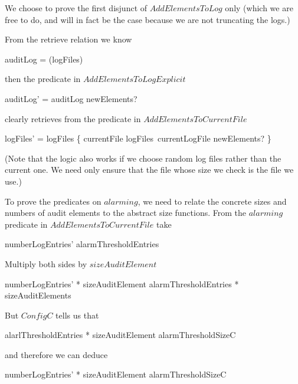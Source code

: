 We choose to prove the first disjunct of $AddElementsToLog$ only
(which we are free to do,
and will in fact be the case because we are not truncating the logs.)

From the retrieve relation we know

\begin{zed}
	auditLog = 
\bigcup (\ran logFiles)
\end{zed}

then the predicate in $AddElementsToLogExplicit$

\begin{argue}
	auditLog' = auditLog \cup newElements?
\end{argue}

clearly retrieves from the predicate in $AddElementsToCurrentFile$

\begin{argue}
	logFiles' = logFiles \oplus
		\{ currentFile \mapsto logFiles~currentLogFile \cup newElements? \}
\end{argue}

(Note that the logic also works if we choose random log files rather than the current one.
We need only ensure that the file whose size we check is the file we use.)

To prove the predicates on $alarming$,
we need to relate the concrete sizes and numbers of audit elements to the abstract size functions.
From the $alarming$ predicate in $AddElementsToCurrentFile$ take

\begin{argue}
	numberLogEntries' \geq alarmThresholdEntries	
\end{argue}

Multiply both sides by $sizeAuditElement$

\begin{argue}
	numberLogEntries' * sizeAuditElement \geq alarmThresholdEntries * sizeAuditElements	
\end{argue}

But $ConfigC$ tells us that

\begin{argue}
	alarlThresholdEntries * sizeAuditElement \geq alarmThresholdSizeC
\end{argue}

and therefore we can deduce

\begin{argue}
	numberLogEntries' * sizeAuditElement \geq alarmThresholdSizeC
\end{argue}

